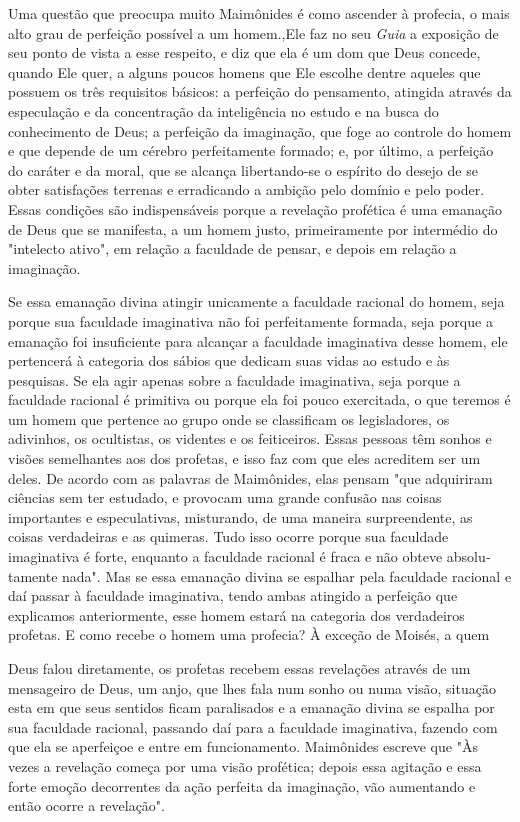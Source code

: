 \begin{itemize}
\begin{enumrate}
Uma questão que preocupa muito Maimônides é como ascender à profecia, o
mais alto grau de perfeição possível a um homem.,Ele faz no seu
\emph{Guia} a exposição de seu ponto de vista a esse respeito, e diz que
ela é um dom que Deus concede, quando Ele quer, a alguns poucos homens
que Ele escolhe dentre aqueles que possuem os três requisitos básicos: a
perfeição do pensa­mento, atingida através da especulação e da
concentração da inteligência no estudo e na busca do conhecimento de
Deus; a perfeição da imaginação, que foge ao controle do homem e que
depende de um cérebro perfeitamente for­mado; e, por último, a perfeição
do caráter e da moral, que se alcança libertando-se o espírito do desejo
de se obter satisfações terrenas e erradicando a ambição pelo domínio e
pelo poder. Essas condições são indispensáveis porque a reve­lação
profética é uma emanação de Deus que se manifesta, a um homem justo,
primeiramente por intermédio do "intelecto ativo", em relação a
faculdade de pensar, e depois em relação a imaginação.

Se essa emanação divina atingir unicamente a faculdade racional do
homem, seja porque sua faculdade imaginativa não foi perfeitamente
formada, seja porque a emanação foi insuficiente para alcançar a
faculdade imaginativa desse homem, ele pertencerá à categoria dos sábios
que dedicam suas vidas ao estudo e às pesquisas. Se ela agir apenas
sobre a faculdade imaginativa, seja por­que a faculdade racional é
primitiva ou porque ela foi pouco exercitada, o que teremos é um homem
que pertence ao grupo onde se classificam os legislado­res, os
adivinhos, os ocultistas, os videntes e os feiticeiros. Essas pessoas
têm sonhos e visões semelhantes aos dos profetas, e isso faz com que
eles acredi­tem ser um deles. De acordo com as palavras de Maimônides,
elas pensam "que adquiriram ciências sem ter estudado, e provocam uma
grande confusão nas coisas importantes e especulativas, misturando, de
uma maneira surpreenden­te, as coisas verdadeiras e as quimeras. Tudo
isso ocorre porque sua faculdade imaginativa é forte, enquanto a
faculdade racional é fraca e não obteve absolu­tamente nada". Mas se
essa emanação divina se espalhar pela faculdade racio­nal e daí passar à
faculdade imaginativa, tendo ambas atingido a perfeição que explicamos
anteriormente, esse homem estará na categoria dos verdadeiros
profetas. E como recebe o homem uma profecia? À exceção de Moisés, a
quem

Deus falou diretamente, os profetas recebem essas revelações através de
um mensageiro de Deus, um anjo, que lhes fala num sonho ou numa visão,
situa­ção esta em que seus sentidos ficam paralisados e a emanação
divina se espalha por sua faculdade racional, passando daí para a
faculdade imaginativa, fazendo com que ela se aperfeiçoe e entre em
funcionamento. Maimônides escreve que "Às vezes a revelação começa por
uma visão profética; depois essa agitação e essa forte emoção
decorrentes da ação perfeita da imaginação, vão aumentan­do e então
ocorre a revelação".


\end{enumrate}
\end{itemize}
